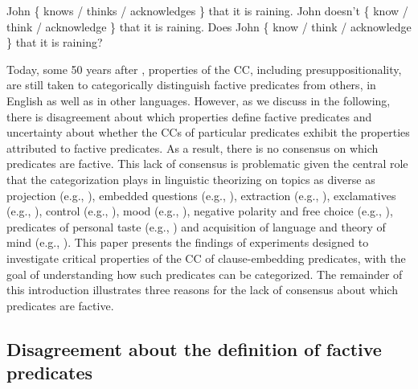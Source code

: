 \documentclass[11pt,fleqn]{article}
\newcommand{\6}{\mbox{$[\hspace*{-.6mm}[$}}
\newcommand{\9}{\mbox{$]\hspace*{-.6mm}]$}}
\begin{document}
\begin{exe}
\ex\label{kk1}
\begin{xlist}
\ex John \{ knows / thinks / acknowledges \} that it is raining.
\ex John doesn't \{ know / think / acknowledge \} that it is raining.
\ex Does John \{ know / think / acknowledge \} that it is raining?
\end{xlist}
\end{exe}
Today, some 50 years after \citealt{kiparsky-kiparsky70}, properties of the CC, including presuppositionality, are still taken to categorically distinguish factive predicates from others, in English as well as in other languages. However, as we discuss in the following, there is disagreement about which properties define factive predicates and uncertainty about whether the CCs of particular predicates exhibit the properties attributed to factive predicates. As a result, there is no consensus on which predicates are factive. This lack of consensus is problematic given the central role that the categorization plays in linguistic theorizing on topics as diverse as projection (e.g., \citealt{karttunen-peters79,vds92}), embedded questions (e.g., \citealt{hintikka1975,guerzoni-sharvit2007,spector-egre2015}), extraction (e.g., \citealt{hukari-levine1995,rooryck2000,abrusan2014}), exclamatives (e.g., \citealt{zanuttini-portner2003}), control (e.g., \citealt{landau2001}), mood (e.g., \citealt{van-gelderen2004,givon95,heycock2006}), negative polarity and free choice (e.g., \citealt{giannakidou1998,giannakidou2001}), predicates of personal taste (e.g., \citealt{lasersohn2009}) and acquisition of language and theory of mind (e.g., \citealt{devillers2005}). 
This paper presents the findings of experiments designed to investigate critical properties of the CC of clause-embedding predicates, with the goal of understanding how such predicates can be categorized. The remainder of this introduction illustrates three reasons for the lack of consensus about which predicates are factive.

\subsection{Disagreement about the definition of factive predicates}\label{s11}
\end{document}
